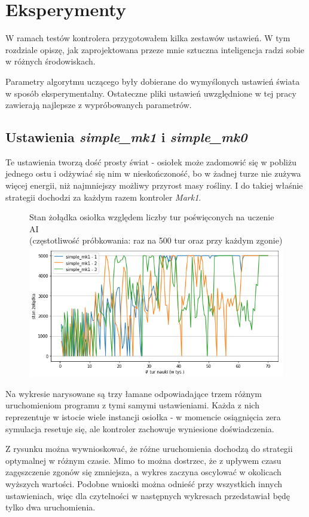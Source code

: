 \chapter{Eksperymenty}
W ramach testów kontrolera przygotowałem kilka zestawów ustawień. W tym rozdziale opiszę, jak zaprojektowana przeze mnie sztuczna inteligencja radzi sobie w różnych środowiskach.

Parametry algorytmu uczącego były dobierane do wymyślonych ustawień świata w sposób eksperymentalny. Ostateczne pliki ustawień uwzględnione w tej pracy zawierają najlepsze z wypróbowanych parametrów.

\section{Ustawienia \textit{simple\_mk1} i \textit{simple\_mk0}}
Te ustawienia tworzą dość prosty świat - osiołek może zadomowić się w pobliżu jednego ostu i odżywiać się nim w nieskończoność, bo w żadnej turze nie zużywa więcej energii, niż najmniejszy możliwy przyrost masy rośliny. I do takiej właśnie strategii dochodzi za każdym razem kontroler \textit{Mark1}.
\begin{figure}[H]
    \centering
    Stan żołądka osiołka względem liczby tur poświęconych na uczenie AI
    \\(częstotliwość próbkowania: raz na 500 tur oraz przy każdym zgonie)
    \includegraphics[scale=0.6]{Chapters/simple_mk1_hunger}
\end{figure}

Na wykresie narysowane są trzy łamane odpowiadające trzem różnym uruchomieniom programu z tymi samymi ustawieniami. Każda z nich reprezentuje w istocie wiele instancji osiołka - w momencie osiągnięcia zera symulacja resetuje się, ale kontroler zachowuje wyniesione doświadczenia. 

Z rysunku można wywnioskować, że różne uruchomienia dochodzą do strategii optymalnej w różnym czasie. Mimo to można dostrzec, że z upływem czasu zagęszczenie zgonów się zmniejsza, a wykres zaczyna oscylować w okolicach wyższych wartości. Podobne wnioski można odnieść przy wszystkich innych ustawieniach, więc dla czytelności w następnych wykresach przedstawiał będę tylko dwa uruchomienia.

